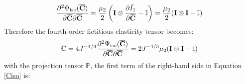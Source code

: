 \begin{equation}
\frac{\partial^2\Psi_\mathrm{iso}(\overline{\bold{C}})}{\partial\overline{\bold{C}}\partial\overline{\bold{C}}} = 
\frac{\mu_2}{2}\left(\bold{I} \otimes \frac{\partial{\bar{I_1}}}{\partial{\overline{\bold{C}}}} - \mathbb{I}\right) = \frac{\mu_2}{2}(\bold{I} \otimes \bold{I} - \mathbb{I})
\end{equation}
Therefore the fourth-order fictitious elasticity tensor becomes:
\begin{equation}
\overline{\mathbb{C}} = 4J^{-4/3}\frac{\partial^2\Psi_\mathrm{iso}(\overline{\bold{C}})}{\partial{\overline{\bold{C}}}{\partial{\overline{\bold{C}}}}} = 2J^{-4/3}\mu_2(\bold{I} \otimes \bold{I} - \mathbb{I})
\end{equation}
with the projection tensor $\mathbb{P}$, the first term of the right-hand side in Equation \ref{Ciso} is:

